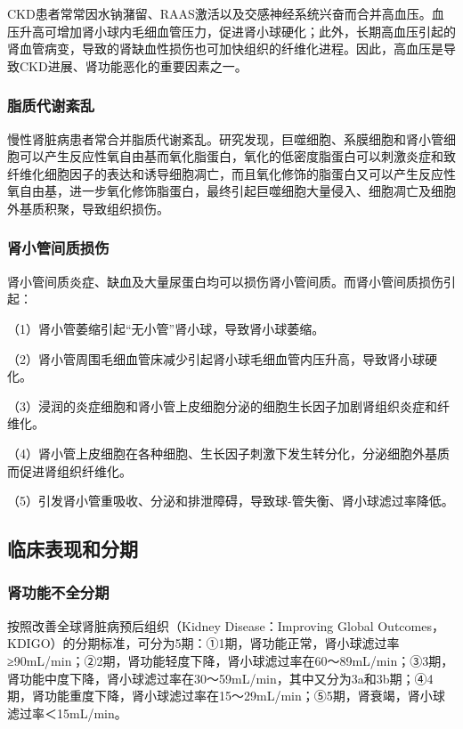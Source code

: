 CKD患者常常因水钠潴留、RAAS激活以及交感神经系统兴奋而合并高血压。血压升高可增加肾小球内毛细血管压力，促进肾小球硬化；此外，长期高血压引起的肾血管病变，导致的肾缺血性损伤也可加快组织的纤维化进程。因此，高血压是导致CKD进展、肾功能恶化的重要因素之一。

\subsubsection{脂质代谢紊乱}

慢性肾脏病患者常合并脂质代谢紊乱。研究发现，巨噬细胞、系膜细胞和肾小管细胞可以产生反应性氧自由基而氧化脂蛋白，氧化的低密度脂蛋白可以刺激炎症和致纤维化细胞因子的表达和诱导细胞凋亡，而且氧化修饰的脂蛋白又可以产生反应性氧自由基，进一步氧化修饰脂蛋白，最终引起巨噬细胞大量侵入、细胞凋亡及细胞外基质积聚，导致组织损伤。

\subsubsection{肾小管间质损伤}

肾小管间质炎症、缺血及大量尿蛋白均可以损伤肾小管间质。而肾小管间质损伤引起：

（1）肾小管萎缩引起“无小管”肾小球，导致肾小球萎缩。

（2）肾小管周围毛细血管床减少引起肾小球毛细血管内压升高，导致肾小球硬化。

（3）浸润的炎症细胞和肾小管上皮细胞分泌的细胞生长因子加剧肾组织炎症和纤维化。

（4）肾小管上皮细胞在各种细胞、生长因子刺激下发生转分化，分泌细胞外基质而促进肾组织纤维化。

（5）引发肾小管重吸收、分泌和排泄障碍，导致球-管失衡、肾小球滤过率降低。

\subsection{临床表现和分期}

\subsubsection{肾功能不全分期}

按照改善全球肾脏病预后组织（Kidney Disease：Improving Global
Outcomes，KDIGO）的分期标准，可分为5期：①1期，肾功能正常，肾小球滤过率≥90mL/min；②2期，肾功能轻度下降，肾小球滤过率在60～89mL/min；③3期，肾功能中度下降，肾小球滤过率在30～59mL/min，其中又分为3a和3b期；④4期，肾功能重度下降，肾小球滤过率在15～29mL/min；⑤5期，肾衰竭，肾小球滤过率＜15mL/min。

